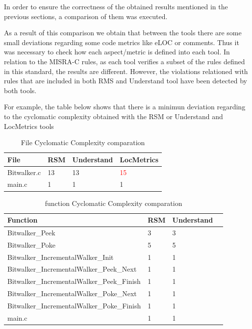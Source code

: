 In order to ensure the correctness of the obtained results mentioned in the previous sections, a comparison of them was executed.

As a result of this comparison we obtain that between the tools there are some small deviations regarding some code metrics like eLOC or comments. Thus it was necessary to check how each aspect/metric is defined into each tool. In relation to the MISRA-C rules, as each tool verifies a subset of the rules defined in this standard, the results are different. However, the violations relationed with rules that are included in both RMS and Understand tool have been detected by both tools.

For example, the table below shows that there is a minimun deviation regarding to the cyclomatic complexity obtained with the RSM or Understand and LocMetrics tools

\begin{longtable}{||p{}|p{}|p{}|p{}||}
  \caption{File Cyclomatic Complexity comparation}\\
    \hline\hline
    \textbf{File} &\textbf{RSM} & \textbf{Understand} & \textbf{LocMetrics}\\
    \hline\hline
    \endhead
    \hline\hline
    \endfoot
    Bitwalker.c & 13 & 13 & \textcolor{red}{15}
    \\
    \hline
    main.c & 1 & 1 & 1
    \\
    \hline
\end{longtable}

\begin{longtable}{||p{}|p{}|p{}|p{}||}
  \caption{function Cyclomatic Complexity comparation}\\
    \hline\hline
    \textbf{Function} &\textbf{RSM} & \textbf{Understand} \\
    \hline\hline
    \endhead
    \hline\hline
    \endfoot
    Bitwalker\_Peek & 3 & 3 
    \\
    \hline
    Bitwalker\_Poke & 5 & 5 
    \\
    \hline
    Bitwalker\_IncrementalWalker\_Init & 1 & 1 
    \\
    \hline
    Bitwalker\_IncrementalWalker\_Peek\_Next & 1 & 1 
    \\
    \hline
    Bitwalker\_IncrementalWalker\_Peek\_Finish & 1 & 1 
    \\
    \hline
    Bitwalker\_IncrementalWalker\_Poke\_Next & 1 & 1 
    \\
    \hline
    Bitwalker\_IncrementalWalker\_Poke\_Finish & 1 & 1 
    \\
    \hline
    main.c & 1 & 1 
    \\
    \hline
\end{longtable}

